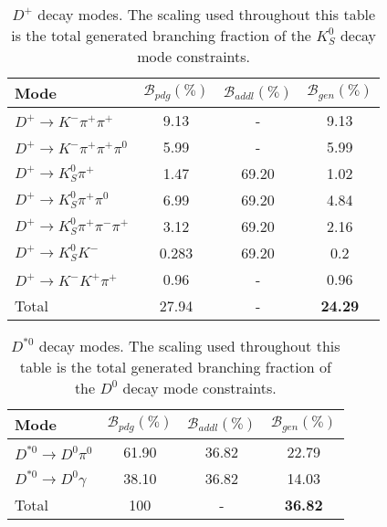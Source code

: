 \documentclass{article}
\renewcommand{\(}{\left(}
\renewcommand{\)}{\right)}
\numberwithin{equation}{section}
\begin{document}
\begin{table}[H]
  \begin{center}
    \begin{tabular}{ l c c c }
      Mode & $\mathcal{B}_{pdg}(\%)$ & $\mathcal{B}_{addl}(\%)$ & $\mathcal{B}_{gen}(\%)$ \\
      \hline\hline
      $D^+\rightarrow K^-\pi^+\pi^+$ & 9.13 & - & 9.13 \\
      \hline
      $D^+\rightarrow K^-\pi^+\pi^+\pi^0$ & 5.99 & - & 5.99 \\
      \hline
      $D^+\rightarrow K^0_S\pi^+$ & 1.47 & 69.20 & 1.02 \\
      \hline
      $D^+\rightarrow K^0_S\pi^+\pi^0$ & 6.99 & 69.20 & 4.84 \\
      \hline
      $D^+\rightarrow K^0_S\pi^+\pi^-\pi^+$ & 3.12 & 69.20 & 2.16 \\
      \hline
      $D^+\rightarrow K^0_S K^-$ & 0.283 & 69.20 & 0.2 \\
      \hline
      $D^+\rightarrow K^- K^+\pi^+$ & 0.96 & - & 0.96 \\
      \hline
      Total & 27.94 & - & \textbf{24.29} \\
      \hline
    \end{tabular}
  \end{center}
  \caption{$D^+$ decay modes. The scaling used throughout this table is the total generated branching fraction of the $K^0_S$ decay mode constraints.}
\end{table}

\begin{table}[H]
  \begin{center}
    \begin{tabular}{ l c c c }
      Mode & $\mathcal{B}_{pdg}(\%)$ & $\mathcal{B}_{addl}(\%)$ & $\mathcal{B}_{gen}(\%)$ \\
      \hline\hline
      $D^{*0}\rightarrow D^0\pi^0$ & 61.90 & 36.82 & 22.79 \\
      \hline
      $D^{*0}\rightarrow D^0\gamma$ & 38.10 & 36.82 &  14.03 \\
      \hline
      Total & 100 & - & \textbf{36.82} \\
      \hline
    \end{tabular}
  \end{center}
  \caption{$D^{*0}$ decay modes. The scaling used throughout this table is the total generated branching fraction of the $D^0$ decay mode constraints.}
\end{table}
\end{document}
